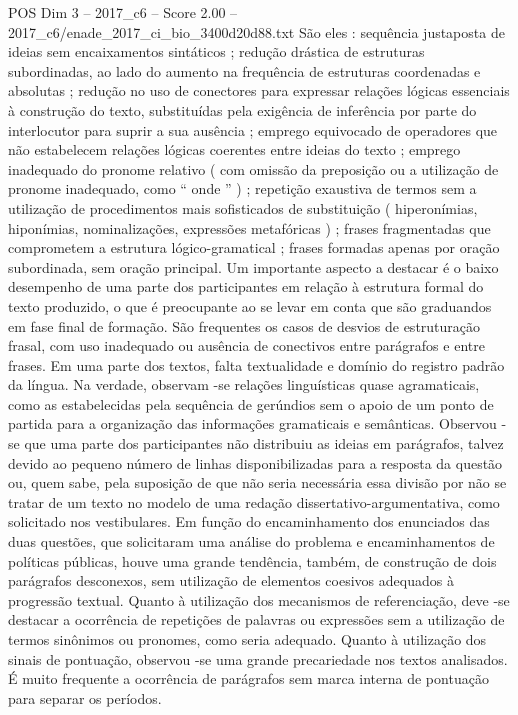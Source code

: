 \begin{textsample}{POS Dim 3 – 2017\_c6 – Score 2.00 – 2017\_c6/enade\_2017\_ci\_bio\_3400d20d88.txt}
São eles : sequência justaposta de ideias sem encaixamentos sintáticos ; redução drástica de estruturas subordinadas, ao lado do aumento na frequência de estruturas coordenadas e absolutas ; redução no uso de conectores para expressar relações lógicas essenciais à construção do texto, substituídas pela exigência de inferência por parte do interlocutor para suprir a sua ausência ; emprego equivocado de operadores que não estabelecem relações lógicas coerentes entre ideias do texto ; emprego inadequado do pronome relativo ( com omissão da preposição ou a utilização de pronome inadequado, como “ onde ” ) ; repetição exaustiva de termos sem a utilização de procedimentos mais sofisticados de substituição ( hiperonímias, hiponímias, nominalizações, expressões metafóricas ) ; frases fragmentadas que comprometem a estrutura lógico-gramatical ; frases formadas apenas por oração subordinada, sem oração principal.
Um importante aspecto a destacar é o baixo desempenho de uma parte dos participantes em relação à estrutura formal do texto produzido, o que é preocupante ao se levar em conta que são graduandos em fase final de formação.
São frequentes os casos de desvios de estruturação frasal, com uso inadequado ou ausência de conectivos entre parágrafos e entre frases.
Em uma parte dos textos, falta textualidade e domínio do registro padrão da língua.
Na verdade, observam -se relações linguísticas quase agramaticais, como as estabelecidas pela sequência de gerúndios sem o apoio de um ponto de partida para a organização das informações gramaticais e semânticas.
Observou -se que uma parte dos participantes não distribuiu as ideias em parágrafos, talvez devido ao pequeno número de linhas disponibilizadas para a resposta da questão ou, quem sabe, pela suposição de que não seria necessária essa divisão por não se tratar de um texto no modelo de uma redação dissertativo-argumentativa, como solicitado nos vestibulares.
Em função do encaminhamento dos enunciados das duas questões, que solicitaram uma análise do problema e encaminhamentos de políticas públicas, houve uma grande tendência, também, de construção de dois parágrafos desconexos, sem utilização de elementos coesivos adequados à progressão textual.
Quanto à utilização dos mecanismos de referenciação, deve -se destacar a ocorrência de repetições de palavras ou expressões sem a utilização de termos sinônimos ou pronomes, como seria adequado.
Quanto à utilização dos sinais de pontuação, observou -se uma grande precariedade nos textos analisados.
É muito frequente a ocorrência de parágrafos sem marca interna de pontuação para separar os períodos.

\end{textsample}
